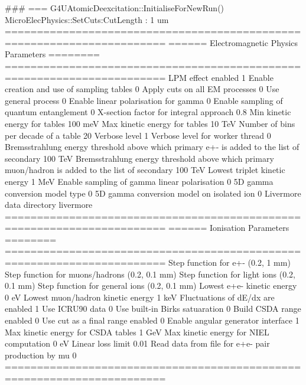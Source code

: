 ### === G4UAtomicDeexcitation::InitialiseForNewRun()
MicroElecPhysics::SetCuts:CutLength : 1 um 
=======================================================================
======                 Electromagnetic Physics Parameters      ========
=======================================================================
LPM effect enabled                                 1
Enable creation and use of sampling tables         0
Apply cuts on all EM processes                     0
Use general process                                0
Enable linear polarisation for gamma               0
Enable sampling of quantum entanglement            0
X-section factor for integral approach             0.8
Min kinetic energy for tables                      100 meV
Max kinetic energy for tables                      10 TeV
Number of bins per decade of a table               20
Verbose level                                      1
Verbose level for worker thread                    0
Bremsstrahlung energy threshold above which 
  primary e+- is added to the list of secondary    100 TeV
Bremsstrahlung energy threshold above which primary
  muon/hadron is added to the list of secondary    100 TeV
Lowest triplet kinetic energy                      1 MeV
Enable sampling of gamma linear polarisation       0
5D gamma conversion model type                     0
5D gamma conversion model on isolated ion          0
Livermore data directory                           livermore
=======================================================================
======                 Ionisation Parameters                   ========
=======================================================================
Step function for e+-                              (0.2, 1 mm)
Step function for muons/hadrons                    (0.2, 0.1 mm)
Step function for light ions                       (0.2, 0.1 mm)
Step function for general ions                     (0.2, 0.1 mm)
Lowest e+e- kinetic energy                         0 eV 
Lowest muon/hadron kinetic energy                  1 keV
Fluctuations of dE/dx are enabled                  1
Use ICRU90 data                                    0
Use built-in Birks satuaration                     0
Build CSDA range enabled                           0
Use cut as a final range enabled                   0
Enable angular generator interface                 1
Max kinetic energy for CSDA tables                 1 GeV
Max kinetic energy for NIEL computation            0 eV 
Linear loss limit                                  0.01
Read data from file for e+e- pair production by mu 0
=======================================================================
